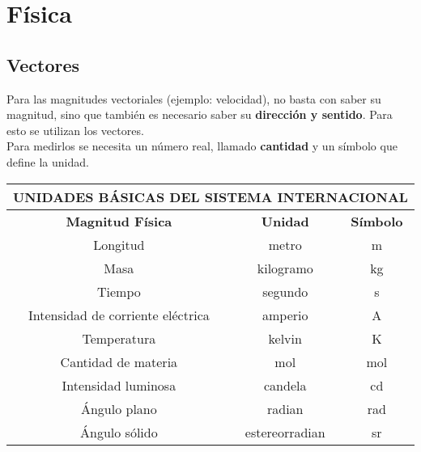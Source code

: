 \chapter*{Física}
\setcounter{chapter}{1}
\setcounter{section}{0}

\section{Vectores}
\setcounter{section}{0}

Para las magnitudes vectoriales (ejemplo: velocidad), no basta con saber su magnitud, sino que también es necesario saber su \textbf{dirección y sentido}. Para esto se utilizan los vectores.\\
Para medirlos se necesita un número real, llamado \textbf{cantidad} y un símbolo que define la unidad.\\

\begin{center}
    \begin{tabular}{|c|c|c|}
        \hline
        \multicolumn{3}{|c|}{\textbf{UNIDADES BÁSICAS DEL SISTEMA INTERNACIONAL}} \\
        \hline
        \textbf{Magnitud Física} & \textbf{Unidad} & \textbf{Símbolo} \\    
        \hline
        Longitud & metro & m \\
        \hline
        Masa & kilogramo & kg \\
        \hline
        Tiempo & segundo & s \\
        \hline
        Intensidad de corriente eléctrica & amperio & A \\
        \hline
        Temperatura & kelvin & K \\
        \hline
        Cantidad de materia & mol & mol \\
        \hline
        Intensidad luminosa & candela & cd \\
        \hline
        Ángulo plano & radian & rad \\
        \hline
        Ángulo sólido & estereorradian & sr \\
        \hline
    \end{tabular}
\end{center}

